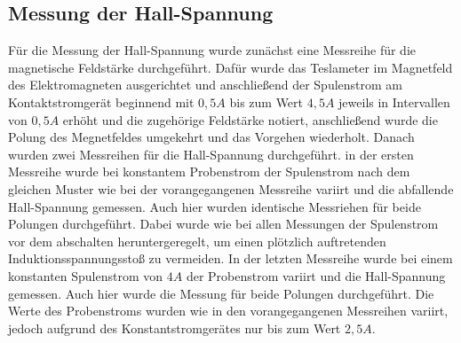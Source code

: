 \subsection{Messung der Hall-Spannung}
Für die Messung der Hall-Spannung wurde zunächst eine Messreihe für die magnetische Feldstärke durchgeführt. Dafür wurde das Teslameter im Magnetfeld des Elektromagneten ausgerichtet und anschließend der Spulenstrom am Kontaktstromgerät
beginnend mit $0,5A$ bis zum Wert $4,5A$ jeweils in Intervallen von $0,5A$ erhöht und die zugehörige Feldstärke notiert, anschließend wurde die Polung des Megnetfeldes umgekehrt und das Vorgehen wiederholt. Danach wurden zwei Messreihen für die Hall-Spannung durchgeführt. in der ersten Messreihe wurde bei konstantem Probenstrom der Spulenstrom nach dem gleichen Muster wie bei der vorangegangenen Messreihe variirt und die abfallende Hall-Spannung gemessen. Auch hier wurden identische Messriehen für beide Polungen durchgeführt. Dabei wurde wie bei allen Messungen der Spulenstrom vor dem abschalten heruntergeregelt, um einen plötzlich auftretenden Induktionsspannungsstoß zu vermeiden. In der letzten Messreihe wurde bei einem konstanten Spulenstrom von $4A$ der Probenstrom variirt und die Hall-Spannung gemessen. Auch hier wurde die Messung für beide Polungen durchgeführt. Die Werte des Probenstroms wurden wie in den vorangegangenen Messreihen variirt, jedoch aufgrund des Konstantstromgerätes nur bis zum Wert $2,5A$. 
